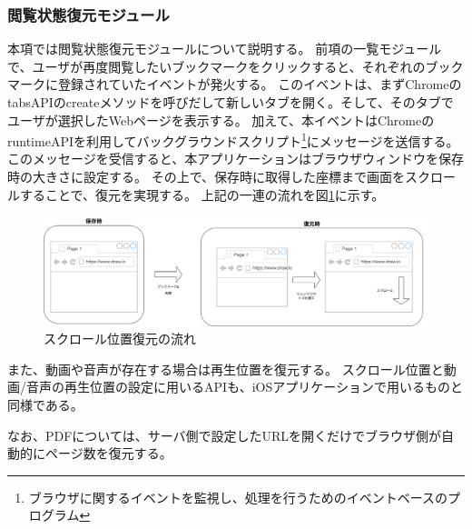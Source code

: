 \subsubsection{閲覧状態復元モジュール}
本項では閲覧状態復元モジュールについて説明する。
前項の一覧モジュールで、ユーザが再度閲覧したいブックマークをクリックすると、それぞれのブックマークに登録されていたイベントが発火する。
このイベントは、まずChromeのtabsAPIのcreateメソッドを呼びだして新しいタブを開く。そして、そのタブでユーザが選択したWebページを表示する。
加えて、本イベントはChromeのruntimeAPI\cite{chrome-runtime-api}を利用してバックグラウンドスクリプト\footnote{ブラウザに関するイベントを監視し、処理を行うためのイベントベースのプログラム}にメッセージを送信する。
このメッセージを受信すると、本アプリケーションはブラウザウィンドウを保存時の大きさに設定する。
その上で、保存時に取得した座標まで画面をスクロールすることで、復元を実現する。
上記の一連の流れを図\ref{fig:impl-scroll-position-flow}に示す。

\begin{figure}[htbp]
  \label{fig:impl-scroll-position-flow}
  \begin{center}
    \includegraphics[bb=0 0 1421 404,width=15cm]{img/050_implementation/chrome/impl-scroll-position-flow.pdf}
  \end{center}
  \caption{スクロール位置復元の流れ}
\end{figure}


また、動画や音声が存在する場合は再生位置を復元する。
スクロール位置と動画/音声の再生位置の設定に用いるAPIも、iOSアプリケーションで用いるものと同様である。

なお、PDFについては、サーバ側で設定したURLを開くだけでブラウザ側が自動的にページ数を復元する。
